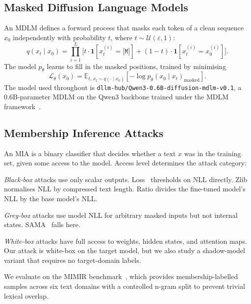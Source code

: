 \subsection{Masked Diffusion Language Models}

An MDLM defines a forward process that masks each token of a clean sequence $x_0$
independently with probability $t$, where $t \sim \mathcal{U}(\varepsilon, 1)$:
\begin{equation}
  q(x_t \mid x_0) = \prod_{i=1}^{L}
    \bigl[ t \cdot \mathbf{1}[x_t^{(i)} = \texttt{[M]}]
         + (1-t) \cdot \mathbf{1}[x_t^{(i)} = x_0^{(i)}] \bigr].
\end{equation}
The model $p_\theta$ learns to fill in the masked positions, trained by minimising
\begin{equation}
  \mathcal{L}_\theta(x_0) = \mathbb{E}_{t,\, x_t \sim q(\cdot\mid x_0)}
    \!\left[ -\log p_\theta(x_0 \mid x_t)_{\mathrm{masked}} \right].
  \label{eq:elbo}
\end{equation}
The model used throughout is \texttt{dllm-hub/Qwen3-0.6B-diffusion-mdlm-v0.1},
a 0.6B-parameter MDLM on the Qwen3 backbone trained under the MDLM
framework~\citep{sahoo2024mdlm,qwen2025}.

\subsection{Membership Inference Attacks}

An MIA is a binary classifier that decides whether a text $x$ was in the training set,
given some access to the model. Access level determines the attack category:

\textit{Black-box} attacks use only scalar outputs.
Loss~\citep{yeom2018privacy} thresholds on NLL directly.
Zlib normalises NLL by compressed text length.
Ratio divides the fine-tuned model's NLL by the base model's NLL.

\textit{Grey-box} attacks use model NLL for arbitrary masked inputs but not internal states.
SAMA~\citep{shi2025sama} falls here.

\textit{White-box} attacks have full access to weights, hidden states, and attention maps.
Our attack is white-box on the target model, but we also study a shadow-model
variant that requires no target-domain labels.

We evaluate on the MIMIR benchmark~\citep{duan2024mimir}, which provides
membership-labelled samples across six text domains with a controlled
n-gram split to prevent trivial lexical overlap.

